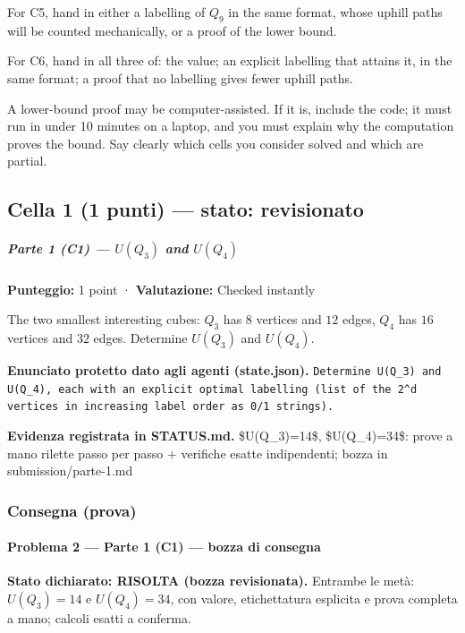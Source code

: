 \documentclass[11pt,a4paper]{article}
\begin{document}
For C5, hand in either a labelling of \(Q_9\) in the same format, whose
uphill paths will be counted mechanically, or a proof of the lower
bound.

For C6, hand in all three of: the value; an explicit labelling that
attains it, in the same format; a proof that no labelling gives fewer
uphill paths.

A lower-bound proof may be computer-assisted. If it is, include the
code; it must run in under 10 minutes on a laptop, and you must explain
why the computation proves the bound. Say clearly which cells you
consider solved and which are partial.

\subsection{Cella 1 (1 punti) — stato: revisionato}
\subparagraph{\texorpdfstring{Parte 1 (C1) --- \(U(Q_3)\) and
\(U(Q_4)\)}{Parte 1 (C1) --- U(Q\_3) and U(Q\_4)}}\label{parte-1-c1-uq_3-and-uq_4}

\textbf{Punteggio:} 1 point · \textbf{Valutazione:} Checked instantly

The two smallest interesting cubes: \(Q_3\) has \(8\) vertices and
\(12\) edges, \(Q_4\) has \(16\) vertices and \(32\) edges. Determine
\(U(Q_3)\) and \(U(Q_4)\).

\textbf{Enunciato protetto dato agli agenti (state.json).} \texttt{Determine U(Q\_3) and U(Q\_4), each with an explicit optimal labelling (list of the 2\textasciicircum{}d vertices in increasing label order as 0/1 strings).}

\textbf{Evidenza registrata in STATUS.md.} \$U(Q\_3)=14\$, \$U(Q\_4)=34\$: prove a mano rilette passo per passo + verifiche esatte indipendenti; bozza in submission/parte-1.md

\subsubsection{Consegna (prova)}
\paragraph{Problema 2 --- Parte 1 (C1) --- bozza di
consegna}\label{problema-2-parte-1-c1-bozza-di-consegna}

\textbf{Stato dichiarato: RISOLTA (bozza revisionata).} Entrambe le
metà: \(U(Q_3)=14\) e \(U(Q_4)=34\), con valore, etichettatura esplicita
e prova completa a mano; calcoli esatti a conferma.
\end{document}
